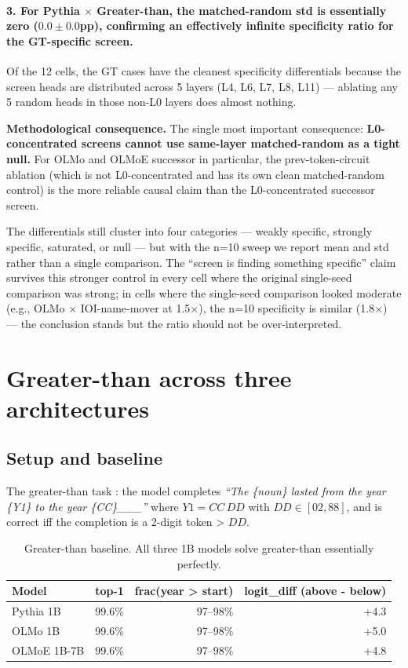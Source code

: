 \documentclass[11pt]{article}
\begin{document}
\paragraph{3. For Pythia $\times$ Greater-than, the matched-random std is essentially zero ($0.0 \pm 0.0$pp), confirming an effectively infinite specificity ratio for the GT-specific screen.} Of the 12 cells, the GT cases have the cleanest specificity differentials because the screen heads are distributed across 5 layers (L4, L6, L7, L8, L11) --- ablating any 5 random heads in those non-L0 layers does almost nothing.

\textbf{Methodological consequence.} The single most important consequence: \textbf{L0-concentrated screens cannot use same-layer matched-random as a tight null.} For OLMo and OLMoE successor in particular, the prev-token-circuit ablation (which is not L0-concentrated and has its own clean matched-random control) is the more reliable causal claim than the L0-concentrated successor screen.

The differentials still cluster into four categories --- weakly specific, strongly specific, saturated, or null --- but with the n=10 sweep we report mean and std rather than a single comparison. The ``screen is finding something specific'' claim survives this stronger control in every cell where the original single-seed comparison was strong; in cells where the single-seed comparison looked moderate (e.g., OLMo $\times$ IOI-name-mover at 1.5$\times$), the n=10 specificity is similar (1.8$\times$) --- the conclusion stands but the ratio should not be over-interpreted.

\section{Greater-than across three architectures}
\label{sec:gt}

\subsection{Setup and baseline}

The greater-than task \citep{hanna2023greater}: the model completes \emph{``The \{noun\} lasted from the year \{Y1\} to the year \{CC\}\_\_\_''} where $Y1 = CC\,DD$ with $DD \in [02, 88]$, and is correct iff the completion is a 2-digit token > $DD$.

\begin{table}[h]
\centering
\small
\begin{tabular}{lrrr}
\toprule
Model & top-1 & frac(year > start) & logit\_diff (above - below) \\
\midrule
Pythia 1B & 99.6\% & 97--98\% & +4.3 \\
OLMo 1B & 99.6\% & 97--98\% & +5.0 \\
OLMoE 1B-7B & 99.6\% & 97--98\% & +4.8 \\
\bottomrule
\end{tabular}
\caption{Greater-than baseline. All three 1B models solve greater-than essentially perfectly.}
\label{tab:gt-baseline}
\end{table}
\end{document}
